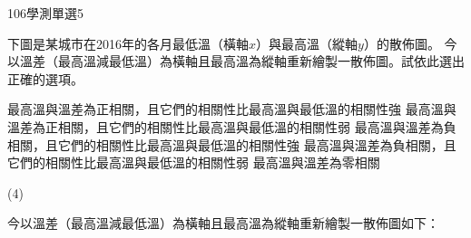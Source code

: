 \begin{QUESTIONS}
\begin{QUESTION}
\begin{QSOLLIST}
        \end{QSOLLIST}
        \begin{QEMPTYSPACE}
        \end{QEMPTYSPACE}
    \end{QUESTION}
    \begin{QUESTION}
        \begin{ExamInfo}{106}{學測}{單選}{5}
        \end{ExamInfo}
        \begin{ExamAnsRateInfo}{37}{64}{35}{12}
        \end{ExamAnsRateInfo}
        \begin{QBODY}
            下圖是某城市在2016年的各月最低溫（橫軸$x$）與最高溫（縱軸$y$）的散佈圖。
            今以溫差（最高溫減最低溫）為橫軸且最高溫為縱軸重新繪製一散佈圖。試依此選出正確的選項。
            
			\begin{QOPS}
				\QOP 最高溫與溫差為正相關，且它們的相關性比最高溫與最低溫的相關性強
				\QOP 最高溫與溫差為正相關，且它們的相關性比最高溫與最低溫的相關性弱
				\QOP 最高溫與溫差為負相關，且它們的相關性比最高溫與最低溫的相關性強
				\QOP 最高溫與溫差為負相關，且它們的相關性比最高溫與最低溫的相關性弱
				\QOP 最高溫與溫差為零相關
			\end{QOPS}
        \end{QBODY}
        \begin{QFROMS}
        \end{QFROMS}
        \begin{QTAGS}\end{QTAGS}
        \begin{QANS}
            (4)
        \end{QANS}
        \begin{QSOLLIST}
            \begin{QSOL}[SOLID=25]
                今以溫差（最高溫減最低溫）為橫軸且最高溫為縱軸重新繪製一散佈圖如下：\\


\end{QSOL}
\end{QSOLLIST}
\end{QUESTION}
\end{QUESTIONS}
